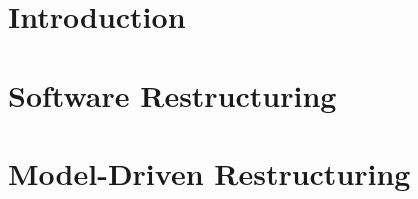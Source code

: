 

\begin{abstract}

\end{abstract}





%
\IEEEpeerreviewmaketitle

\section{Introduction}
	

	
	
\section{Software Restructuring\label{software restructuring}}
	

\section{Model-Driven Restructuring\label{MDD}}
	
		
